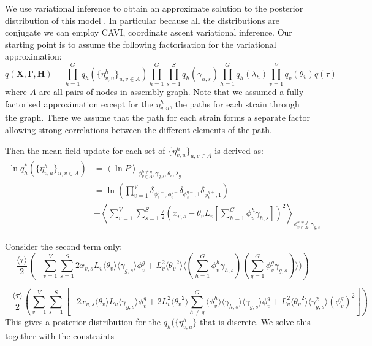 \documentclass[10pt]{article}
\begin{document}
We use variational inference to obtain an approximate solution to the posterior distribution of this model \cite{blei17}. In 
particular because all the distributions are conjugate we can employ CAVI, coordinate ascent variational inference. Our starting 
point is to assume the following factorisation for the variational approximation:
\begin{equation}
q(\mathbf{X},\mathbf{\Gamma},\mathbf{H})  =  \prod_{h=1}^G q_h(\{ \eta^h_{v,u} \} _{u,v \in A}) \prod_{h=1}^G \prod_{s=1}^S q_h(\gamma_{h,s})  \prod_{h=1}^G q_h(\lambda_{h}) \prod_{v=1}^V q_v(\theta_v) q(\tau)
\end{equation}
where $A$ are all pairs of nodes in assembly graph. Note that we assumed a fully factorised approximation except for the $\eta^h_{v,u}$, the paths for each strain through the graph.  There 
we assume that the path for each strain forms a separate factor allowing strong correlations between the different elements of the path.

\noindent Then the mean field update for each set of $ \{\eta^h_{v,u}\}_{u,v \in A}$ is derived as:
\begin{align*}
\ln q_h^*( \{ \eta^h_{v,u} \} _{u,v \in A}) & =  \left\langle \ln P \right\rangle _{ \phi^{h \neq g}_{v \in A},\gamma_{g,s}, \theta_v, \lambda_g}  \\
& =  \ln \left( \prod_{v=1}^V \delta_{ \phi^{g+}_v, \phi^{g-}_v} \delta_{\phi^{g-}_s,1}  \delta_{\phi^{g+}_t,1} \right) \\
& - \left\langle \sum_{v=1}^V \sum_{s=1}^S \frac{\tau}{2} \left( x_{v,s} - \theta_v L_v[\sum_{h=1}^G \phi^h_v \gamma_{h,s}] \right)^2 \right\rangle _{ \phi^{h \neq g}_{v \in A},\gamma_{g,s}}
\end{align*}

\noindent Consider the second term only:
\begin{equation*}
 - \frac{\langle \tau \rangle}{2}  \left ( 
- \sum_{v=1}^V \sum_{s=1}^S 2 x_{v,s} L_v \langle \theta_v \rangle \langle \gamma_{g,s} \rangle \phi^{g}_v
+ L_v^2 \langle {\theta_v}^2 \rangle \langle (\sum_{h=1}^G \phi^h_v \gamma_{h,s}) (\sum_{g=1}^G \phi^g_v \gamma_{g,s}) \rangle)
\right )
\end{equation*}

\begin{equation*}
 - \frac{\langle \tau \rangle}{2} \left ( 
 \sum_{v=1}^V \sum_{s=1}^S \left [ -2 x_{v,s} \langle \theta_v \rangle L_v \langle \gamma_{g,s} \rangle \phi^{g}_v
+ 2 L_v^ 2 \langle {\theta_v}^2 \rangle \sum_{h \neq g }^G \langle \phi^h_v \rangle \langle \gamma_{h,s} \rangle \langle \gamma_{g,s} \rangle \phi^{g}_v
+ L_v^2  \langle {\theta_v}^2 \rangle \langle \gamma_{g,s}^2 \rangle (\phi^{g}_v)^2
\right]
\right )
\end{equation*}
This gives a posterior distribution for the  $q_h(\{ \eta^h_{v,u} \}$ that is discrete. 
We solve this together with the constraints  
\end{document}
